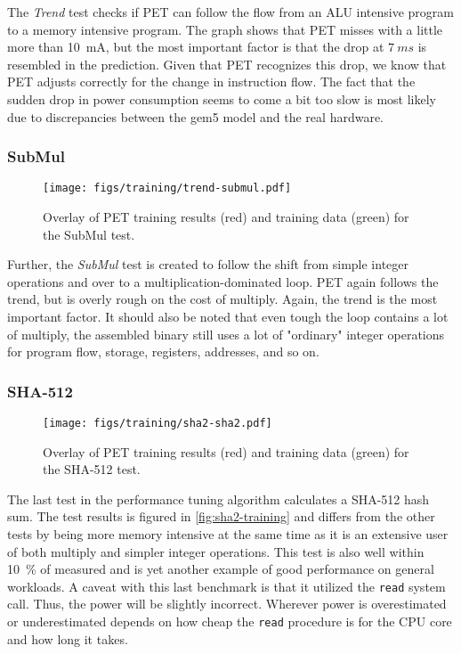 The \emph{Trend} test checks if PET can follow the flow from an ALU intensive
program to a memory intensive program. The graph shows that PET misses with a
little more than 10~mA, but the most important factor is that the drop at $7~ms$
is resembled in the prediction. Given that PET recognizes this drop, we know that PET adjusts
correctly for the change in instruction flow. The fact that the sudden drop in
power consumption seems to come a bit too slow is most likely due to
discrepancies between the gem5 model and the real hardware.

\newpage

\subsubsection{SubMul}
\begin{figure}[htb]
    \centering
    \texttt{[image: figs/training/trend-submul.pdf]}
    \caption{Overlay of PET training results (red) and training data (green) for the SubMul test.}
    \label{fig:submul-training}
\end{figure}

Further, the \emph{SubMul} test is created to follow the shift from simple
integer operations and over to a multiplication-dominated loop. PET again
follows the trend, but is overly rough on the cost of multiply. Again, the trend
is the most important factor. It should also be noted that even tough the loop
contains a lot of multiply, the assembled binary still uses a lot of "ordinary"
integer operations for program flow, storage, registers, addresses, and so on.

\newpage

\subsubsection{SHA-512}
\begin{figure}[htb]
    \centering
    \texttt{[image: figs/training/sha2-sha2.pdf]}
    \caption{Overlay of PET training results (red) and training data (green) for
    the SHA-512 test.}
    \label{fig:sha2-training}
\end{figure}

The last test in the performance tuning algorithm calculates a
SHA-512 hash sum. The test results is figured in \autoref{fig:sha2-training} and
differs from the other tests by being more memory intensive at the same time
as it is an extensive user of both multiply and simpler integer operations. This
test is also well within 10~\% of measured and is yet another example of good
performance on general workloads. A caveat with this last benchmark is that it
utilized the \texttt{read} system call. Thus, the power will be slightly
incorrect. Wherever power is overestimated or underestimated depends on how
cheap the \texttt{read} procedure is for the CPU core and how long it takes.

